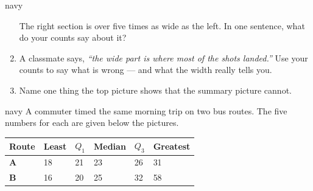 \documentclass[12pt]{article}
\newcommand{\answerspace}[2]{\par\nopagebreak\noindent\begin{minipage}[t][#1][t]{\linewidth}%
  \color{keyred}\bfseries #2\end{minipage}\par}
\newcommand{\bxp}[7]{%
  \draw[thick, navy] (#3,#1) -- (#4,#1);
  \draw[thick, navy] (#6,#1) -- (#7,#1);
  \draw[thick, navy] (#3,{#1-#2}) -- (#3,{#1+#2});
  \draw[thick, navy] (#7,{#1-#2}) -- (#7,{#1+#2});
  \draw[thick, navy, fill=skymid] (#4,{#1-#2}) rectangle (#6,{#1+#2});
  \draw[very thick, navy] (#5,{#1-#2}) -- (#5,{#1+#2});}
\begin{document}
\begin{scenariobox}{navy}
\begin{enumerate}[label=\textbf{\alph*.}, leftmargin=1.8em, itemsep=4pt]
        \vspace{4pt}
        The right section is over five times as wide as the left. In one sentence, what do your
        counts say about it?
        \answerspace{1.6cm}{}
  \item A classmate says, \emph{``the wide part is where most of the shots landed.''} Use your
        counts to say what is wrong --- and what the width really tells you.
        \answerspace{1.6cm}{}
  \item Name one thing the top picture shows that the summary picture cannot.
        \answerspace{1.4cm}{}
\end{enumerate}
\end{scenariobox}

\boxguard[16]
\begin{scenariobox}{navy}
A commuter timed the same morning trip on two bus routes. The five numbers for each are given
below the pictures.

\vspace{3pt}
\begin{center}
\end{center}

\renewcommand{\arraystretch}{1.2}
\begin{center}
\begin{tabularx}{0.92\linewidth}{@{} l Y Y Y Y Y @{}}
\textbf{Route} & \textbf{Least} & \textbf{$Q_1$} & \textbf{Median} & \textbf{$Q_3$} &
\textbf{Greatest} \\
\hline
\textbf{A} & 18 & 21 & 23 & 26 & 31 \\
\textbf{B} & 16 & 20 & 25 & 32 & 58 \\
\end{tabularx}
\end{center}
\vspace{3pt}


\end{scenariobox}
\end{document}
